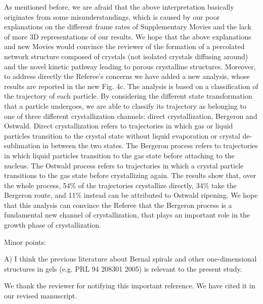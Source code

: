 \documentclass[11pt]{article}
\begin{document}
\bigskip
\doublespacing

As mentioned before, we are afraid that the above interpretation basically originates from some misunderstandings, which is caused by our poor explanations on the different frame rates of Supplementary Movies and the lack of more 3D representations of our results. We hope that the above explanations and new Movies would convince the reviewer of the formation of a percolated network structure composed of crystals (not isolated crystals diffusing around) and the novel kinetic pathway leading to porous crystalline structures.
Moreover, to address directly the Referee's concerns we have added a new analysis, whose results are reported in the new Fig. 4c.
The analysis is based on a classification of the trajectory of
each particle. By considering the different state transformation that a particle undergoes, we are able to classify its trajectory as belonging to one of three different crystallization channels: direct crystallization, Bergeron and Ostwald. Direct crystallization refers to trajectories in
which gas or liquid particles transition to the crystal state without liquid evaporation or crystal de-sublimation in between the two states.
The Bergeron process refers to trajectories in which liquid particles transition to the gas state before attaching to the nucleus. The Ostwald
process refers to trajectories in which a crystal particle transitions to the gas state before crystallizing again.
The results show that, over the whole process, 54\% of the trajectories crystallize directly, 34\% take the Bergeron route, and
11\% instead can be attributed to Ostwald ripening. We hope that this analysis can convince the Referee that the Bergeron process is a
fundamental new channel of crystallization, that plays an important role in the growth phase of crystallization.


\vspace{1em}

\singlespacing

{\bf

Minor points:

A) I think the previous literature about Bernal spirals and other one-dimensional structures in gels (e.g. PRL 94 208301 2005) is relevant to the present study.
}




\bigskip
\doublespacing

We thank the reviewer for notifying this important reference. We have cited it in our revised manuscript. 
\end{document}

